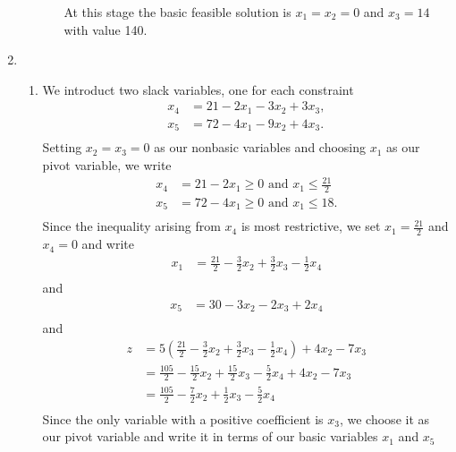 \documentclass[10pt]{article}
\begin{document}
\begin{enumerate}
\begin{enumerate}
\begin{enumerate}
          At this stage the basic feasible solution is $x_1 = x_2 = 0$ and
          $x_3 = 14$ with value 140.
      \end{enumerate}
    \end{enumerate}
    \item
      \begin{enumerate}
          \item We introduct two slack variables, one for each constraint
          \begin{align*}
            x_4  &=  21 - 2x_1 - 3x_2 + 3x_3, \\
            x_5  &=  72 - 4x_1 - 9x_2 + 4x_3. \\
          \end{align*}
          Setting $x_2 = x_3 = 0$ as our nonbasic variables and choosing $x_1$
          as our pivot variable, we write
          \begin{align*}
            x_4  &=  21 - 2x_1 \geq 0 \text{ and } x_1 \leq \frac{21}{2} \\
            x_5  &=  72 - 4x_1 \geq 0 \text{ and } x_1 \leq 18. \\
          \end{align*}
          Since the inequality arising from $x_4$ is most restrictive, we set
          $x_1 = \frac{21}{2}$ and $x_4 = 0$ and write
          \begin{align*}
            x_1  &=  \frac{21}{2} - \frac{3}{2}x_2 + \frac{3}{2}x_3 - \frac{1}{2}x_4 \\
          \end{align*}
          and
          \begin{align*}
            x_5 &= 30 - 3x_2 - 2x_3 + 2x_4 \\
          \end{align*}
          and
          \begin{align*}
            z &= 5\left(\frac{21}{2} - \frac{3}{2}x_2 + \frac{3}{2}x_3 - \frac{1}{2}x_4\right) + 4x_2 - 7x_3 \\
              &= \frac{105}{2} - \frac{15}{2}x_2 + \frac{15}{2}x_3 - \frac{5}{2}x_4 + 4x_2 - 7x_3\\
              &= \frac{105}{2} - \frac{7}{2}x_2 + \frac{1}{2}x_3 - \frac{5}{2}x_4 \\
          \end{align*}
          Since the only variable with a positive coefficient is $x_3$, we
          choose it as our pivot variable and write it in terms of our basic
          variables $x_1$ and $x_5$

\end{enumerate}
\end{enumerate}
\end{document}
